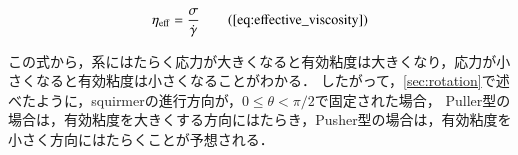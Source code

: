     \begin{equation}
        \eta_\mathrm{eff} = \frac{\sigma}{\dot{\gamma}}
        \tag{\ref{eq:effective_viscosity}}
    \end{equation}

\noindent
この式から，系にはたらく応力が大きくなると有効粘度は大きくなり，応力が小さくなると有効粘度は小さくなることがわかる．
したがって，\ref{sec:rotation}で述べたように，squirmerの進行方向が，$0 \leq \theta < \pi /2$で固定された場合，
Puller型の場合は，有効粘度を大きくする方向にはたらき，Pusher型の場合は，有効粘度を小さく方向にはたらくことが予想される．
